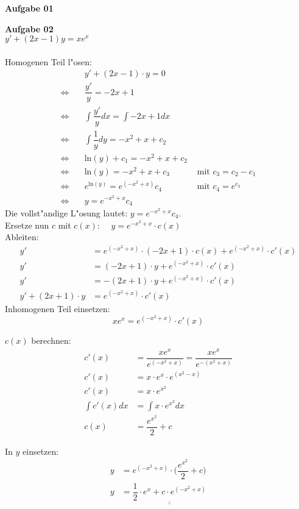 \documentclass[a4paper,10pt]{article}
\begin{document}
	\parindent0pt
	\textbf{Aufgabe 01}\\
	
	\newpage
	
	\textbf{Aufgabe 02}\\
	$y' + (2x - 1)y = xe^x$\\\\
	Homogenen Teil l"osen:\\
	\begin{align*}
		& y' + (2x - 1) \cdot y   =  0\\
		\Leftrightarrow \quad & \dfrac{y'}{y}  =  -2x + 1	\\
		\Leftrightarrow \quad & \int \dfrac{y'}{y}dx  =  \int-2x + 1 dx \\
		\Leftrightarrow \quad & \int \dfrac{1}{y}dy  =  -x^2 + x +c_2\\
		\Leftrightarrow \quad & \text{ln}(y) + c_1  =  -x^2 + x +c_2 \\
		\Leftrightarrow \quad & \text{ln}(y)  =  -x^2+ x + c_3  & \text{ mit }c_3 = c_2 - c_1 \\
		\Leftrightarrow \quad & e^{\text{ln}(y)}  = e^{(-x^2+x)}c_4  & \text{ mit } c_4 = e^{c_3} \\
		\Leftrightarrow \quad & y = e^{-x^2 + x}c_4
	\end{align*}
	Die vollst"andige L"osung lautet: $y = e^{-x^2 + x}c_4$.\\
		
	Ersetze nun $c$ mit $c(x)$: $\quad y = e^{-x^2 + x} \cdot c(x)$\\
	
	Ableiten:
	\begin{align*}
		y' & = e^{(-x^2 + x)} \cdot (-2x + 1) \cdot c(x) + e^{(-x^2 + x)} \cdot c'(x)\\
		y' & = (-2x +1) \cdot y + e^{(-x^2 + x)} \cdot c'(x)\\
		y' & = -(2x +1) \cdot y + e^{(-x^2 + x)} \cdot c'(x)\\
		y' + (2x +1) \cdot y & = e^{(-x^2 + x)} \cdot c'(x)
	\end{align*}
	Inhomogenen Teil einsetzen: \[xe^x = e^{(-x^2 + x)} \cdot c'(x)\]
	
	$c(x)$ berechnen:
	\begin{align*}
		c'(x) & = \dfrac{xe^x}{e^{(-x^2 + x)}} = \dfrac{xe^x}{e^{-(x^2 + x)}} \\
		c'(x) & = x\cdot e^x \cdot e^{(x^2 - x)} \\
		c'(x) & = x\cdot e^{x^2}\\
		\int c'(x) dx & = \int x \cdot e^{x^2} dx\\
		c(x) & = \dfrac{e^{x^2}}{2} + c
	\end{align*}

	In $y$ einsetzen:
	\begin{align*}
	y & = e^{(-x^2 + x)} \cdot \Big( \dfrac{e^{x^2}}{2} + c\Big)\\
	y & = \underline{\underline{\dfrac{1}{2} \cdot e^x + c \cdot e^{(-x^2 + x)}}}
	\end{align*}
\end{document}
